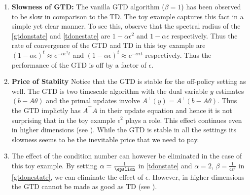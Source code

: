 \begin{table}
\end{table}
\begin{enumerate}[leftmargin=*]
\item \textbf{Slowness of GTD:} The vanilla GTD algorithm ($\beta=1$) has been observed to be slow in comparison to the TD. The toy example captures this fact in a simple yet clear manner. To see this, observe that the spectral radius of the \eqref{gtdonstate} and \eqref{tdonestate} are $1-\alpha\epsilon^2$ and $1-\alpha\epsilon$ respectively. Thus the rate of convergence of the GTD  and TD in this toy example are $(1-\alpha\epsilon)^t\approx e^{-\alpha\epsilon^2 t}$ and $(1-\alpha\epsilon)^t\approx e^{-\alpha\epsilon t}$ respectively. Thus the performance of the GTD is off by a factor of $\epsilon$.
\item \textbf{Price of Stabiity} Notice that the GTD is stable for the off-policy setting as well. The GTD is two timescale algorithm with the dual variable $y$ estimates $(b-A\theta)$ and the primal updates involve $A^\top(y)=A^\top(b-A\theta)$. Thus the GTD implictly has $A^\top A$ in their update equation and hence it is not surprising that in the toy example $\epsilon^2$ plays a role. This effect continues even in higher dimensions (see ). While the GTD is stable in all the settings its slowness seems to be the inevitable price that we need to pay.
\item The effect of the condition number can however be eliminated in the case of this toy example. By setting $\alpha=\frac{1}{\epslion}$ in \eqref{tdonstate} and $\alpha=2$, $\beta=\frac{1}{4\epsilon^2}$ in \eqref{gtdonestate}, we can eliminate the effect of $\epsilon$. However, in higher dimensions the GTD cannot be made as good as TD (see \Cref{}).
\end{enumerate}
